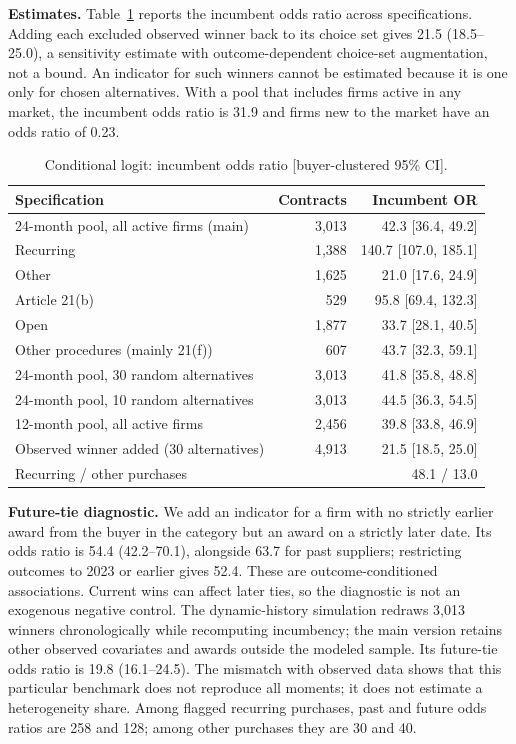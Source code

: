 \documentclass[11pt,a4paper]{article}
\newcommand{\botrule}{\bottomrule}
\begin{document}
\textbf{Estimates.} Table~\ref{tab:clogit} reports the incumbent odds ratio across specifications. Adding each excluded observed winner back to its choice set gives 21.5 (18.5--25.0), a sensitivity estimate with outcome-dependent choice-set augmentation, not a bound. An indicator for such winners cannot be estimated because it is one only for chosen alternatives. With a pool that includes firms active in any market, the incumbent odds ratio is 31.9 and firms new to the market have an odds ratio of 0.23.

\begin{table}[h]\centering\small
\caption{Conditional logit: incumbent odds ratio [buyer-clustered 95\% CI].}\label{tab:clogit}
\begin{tabular}{@{}lrr@{}}
\toprule
Specification & Contracts & Incumbent OR\\
\midrule
24-month pool, all active firms (main) & 3,013 & 42.3 [36.4, 49.2]\\
\quad Recurring & 1,388 & 140.7 [107.0, 185.1]\\
\quad Other & 1,625 & 21.0 [17.6, 24.9]\\
\quad Article 21(b) & 529 & 95.8 [69.4, 132.3]\\
\quad Open & 1,877 & 33.7 [28.1, 40.5]\\
\quad Other procedures (mainly 21(f)) & 607 & 43.7 [32.3, 59.1]\\
24-month pool, 30 random alternatives & 3,013 & 41.8 [35.8, 48.8]\\
24-month pool, 10 random alternatives & 3,013 & 44.5 [36.3, 54.5]\\
12-month pool, all active firms & 2,456 & 39.8 [33.8, 46.9]\\
Observed winner added (30 alternatives) & 4,913 & 21.5 [18.5, 25.0]\\
\quad Recurring / other purchases & & 48.1 / 13.0\\
\botrule
\end{tabular}
\end{table}

\textbf{Future-tie diagnostic.} We add an indicator for a firm with no strictly earlier award from the buyer in the category but an award on a strictly later date. Its odds ratio is 54.4 (42.2--70.1), alongside 63.7 for past suppliers; restricting outcomes to 2023 or earlier gives 52.4. These are outcome-conditioned associations. Current wins can affect later ties, so the diagnostic is not an exogenous negative control. The dynamic-history simulation redraws 3,013 winners chronologically while recomputing incumbency; the main version retains other observed covariates and awards outside the modeled sample. Its future-tie odds ratio is 19.8 (16.1--24.5). The mismatch with observed data shows that this particular benchmark does not reproduce all moments; it does not estimate a heterogeneity share. Among flagged recurring purchases, past and future odds ratios are 258 and 128; among other purchases they are 30 and 40.
\end{document}
